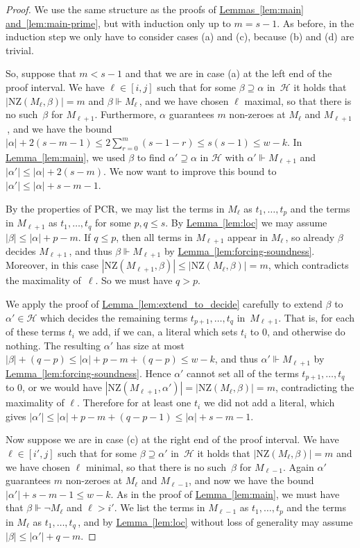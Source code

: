\documentclass[11pt]{article}
\numberwithin{equation}{section}
\theoremstyle{definition}
\theoremstyle{plain}
\newcommand{\expref}[2]{\hyperref[#2]{#1~\ref{#2}}}
\newcommand\calH{\mathcal{H}}
\newcommand\rmNZ{\mathrm{NZ}}
\begin{document}
\begin{proof}
We use the same structure as the proofs of \expref{Lemmas}{lem:main}
\expref{and}{lem:main-prime},  %
but with induction only up to $m=s-1$. As before, in the induction step we only have to consider
cases (a) and (c), because (b) and (d) are trivial.

So, suppose that $m<s-1$ and that we are in case (a) at the left end 
of the proof interval. We have  $\ell \in [i,j]$ such that for some $\beta \supseteq \alpha$ in~$\calH$
it holds that $|\rmNZ(M_\ell, \beta)| = m$ and $\beta \Vdash M_\ell$\,,
and we have chosen $\ell$ maximal, so that there is no such~$\beta$ for $M_{\ell+1}$. 
Furthermore, $\alpha$ guarantees $m$ non-zeroes at $M_\ell$ and $M_{\ell+1}$\,, and
we have the bound
$|\alpha| + 2(s-m-1) \le 2 \sum_{r=0}^{m} (s-1-r) \le s(s-1) \le w - k$.
In \expref{Lemma}{lem:main}, we used $\beta$ to find $\alpha' \supseteq \alpha$ in $\calH$
with $\alpha' \Vdash M_{\ell+1}$ and $|\alpha'| \le |\alpha|+2(s-m)$. 
We now want  to improve this bound to $|\alpha'| \le |\alpha|+s-m-1$.

By the properties of PCR, we may list the terms in $M_\ell$ as $t_1, \dots, t_p$
and the terms in $M_{\ell+1}$ as $t_1, \dots, t_q$ for some $p,q \le s$.
By \expref{Lemma}{lem:loc} we may assume $|\beta| \le |\alpha|+p-m$.
If $q \le p$, then all terms in $M_{\ell+1}$ appear in $M_\ell$\,,
so already $\beta$ decides $M_{\ell+1}$\,, and thus 
$\beta \Vdash M_{\ell+1}$ by \expref{Lemma}{lem:forcing-soundness}.
Moreover, in this case $|\rmNZ(M_{\ell+1}, \beta)| \le |\rmNZ(M_\ell, \beta)| = m$, 
which contradicts the maximality of~$\ell$. So we must have $q>p$.


We  apply the proof of  \expref{Lemma}{lem:extend_to_decide} carefully
to extend $\beta$ to $\alpha' \in \calH$ which
decides the remaining terms $t_{p+1}, \dots, t_q$ in~$M_{\ell+1}$.
That is, for each of these terms $t_i$ we add, if we can, a literal which sets $t_i$ to $0$, and otherwise do nothing.
The resulting $\alpha'$
has size at most $|\beta| + (q-p) \le |\alpha|+ p-m + (q-p) \le w-k$, and thus $\alpha' \Vdash M_{\ell+1}$
by \expref{Lemma}{lem:forcing-soundness}. Hence $\alpha'$
cannot set all of the terms $t_{p+1}, \dots, t_q$ to $0$, 
or we would have $|\rmNZ(M_{\ell+1}, \alpha')| = |\rmNZ(M_\ell, \beta)|=m$, 
contradicting the maximality of $\ell$.
Therefore for at least one $t_i$ we did not add a literal,
which gives $|\alpha'| \le |\alpha|+p-m + (q-p-1) \le |\alpha|+ s-m-1$.

Now suppose we are in case (c) at the right end of the proof interval.
We have  $\ell \in [i',j]$ such that for some $\beta \supseteq \alpha'$ in~$\calH$
it holds that $|\rmNZ(M_{\ell}, \beta)| = m$ 
and we have chosen $\ell$ minimal, so that there is no such~$\beta$ for $M_{\ell-1}$. 
Again $\alpha'$ guarantees $m$ non-zeroes at $M_\ell$ and $M_{\ell-1}$, and now
we have the bound
$|\alpha'| + s-m-1 \le w - k$.
As in the proof of \expref{Lemma}{lem:main}, we must have 
that $\beta \Vdash \neg M_{\ell}$ and $\ell > i'$.
We list the terms in $M_{\ell-1}$ as $t_1, \dots, t_p$
and the terms in $M_{\ell}$ as $t_1, \dots, t_q$\,,
and by \expref{Lemma}{lem:loc} without loss of generality may assume 
$|\beta| \le |\alpha'|+q-m$.


\end{proof}
\end{document}
